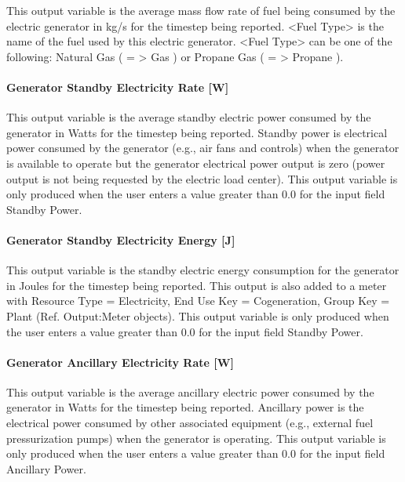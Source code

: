 This output variable is the average mass flow rate of fuel being consumed by the electric generator in kg/s for the timestep being reported. \textless{}Fuel Type\textgreater{} is the name of the fuel used by this electric generator. \textless{}Fuel Type\textgreater{} can be one of the following: Natural Gas ( = \textgreater{} Gas ) or Propane Gas ( = \textgreater{} Propane ).

\paragraph{Generator Standby Electricity Rate {[}W{]}}\label{generator-standby-electric-power-w}

This output variable is the average standby electric power consumed by the generator in Watts for the timestep being reported. Standby power is electrical power consumed by the generator (e.g., air fans and controls) when the generator is available to operate but the generator electrical power output is zero (power output is not being requested by the electric load center). This output variable is only produced when the user enters a value greater than 0.0 for the input field Standby Power.

\paragraph{Generator Standby Electricity Energy {[}J{]}}\label{generator-standby-electric-energy-j}

This output variable is the standby electric energy consumption for the generator in Joules for the timestep being reported. This output is also added to a meter with Resource Type = Electricity, End Use Key = Cogeneration, Group Key = Plant (Ref. Output:Meter objects). This output variable is only produced when the user enters a value greater than 0.0 for the input field Standby Power.

\paragraph{Generator Ancillary Electricity Rate {[}W{]}}\label{generator-ancillary-electric-power-w}

This output variable is the average ancillary electric power consumed by the generator in Watts for the timestep being reported. Ancillary power is the electrical power consumed by other associated equipment (e.g., external fuel pressurization pumps) when the generator is operating. This output variable is only produced when the user enters a value greater than 0.0 for the input field Ancillary Power.

